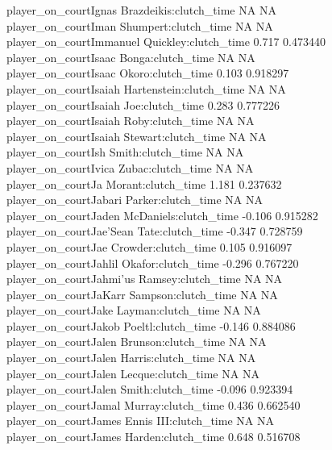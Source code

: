 \documentclass[
  landscape]{article}
\begin{document}
{player\_on\_courtIgnas Brazdeikis:clutch\_time NA NA\\
player\_on\_courtIman Shumpert:clutch\_time NA NA\\
player\_on\_courtImmanuel Quickley:clutch\_time 0.717 0.473440\\
player\_on\_courtIsaac Bonga:clutch\_time NA NA\\
player\_on\_courtIsaac Okoro:clutch\_time 0.103 0.918297\\
player\_on\_courtIsaiah Hartenstein:clutch\_time NA NA\\
player\_on\_courtIsaiah Joe:clutch\_time 0.283 0.777226\\
player\_on\_courtIsaiah Roby:clutch\_time NA NA\\
player\_on\_courtIsaiah Stewart:clutch\_time NA NA\\
player\_on\_courtIsh Smith:clutch\_time NA NA\\
player\_on\_courtIvica Zubac:clutch\_time NA NA\\
player\_on\_courtJa Morant:clutch\_time 1.181 0.237632\\
player\_on\_courtJabari Parker:clutch\_time NA NA\\
player\_on\_courtJaden McDaniels:clutch\_time -0.106 0.915282\\
player\_on\_courtJae'Sean Tate:clutch\_time -0.347 0.728759\\
player\_on\_courtJae Crowder:clutch\_time 0.105 0.916097\\
player\_on\_courtJahlil Okafor:clutch\_time -0.296 0.767220\\
player\_on\_courtJahmi'us Ramsey:clutch\_time NA NA\\
player\_on\_courtJaKarr Sampson:clutch\_time NA NA\\
player\_on\_courtJake Layman:clutch\_time NA NA\\
player\_on\_courtJakob Poeltl:clutch\_time -0.146 0.884086\\
player\_on\_courtJalen Brunson:clutch\_time NA NA\\
player\_on\_courtJalen Harris:clutch\_time NA NA\\
player\_on\_courtJalen Lecque:clutch\_time NA NA\\
player\_on\_courtJalen Smith:clutch\_time -0.096 0.923394\\
player\_on\_courtJamal Murray:clutch\_time 0.436 0.662540\\
player\_on\_courtJames Ennis III:clutch\_time NA NA\\
player\_on\_courtJames Harden:clutch\_time 0.648 0.516708\\
}
\end{document}
